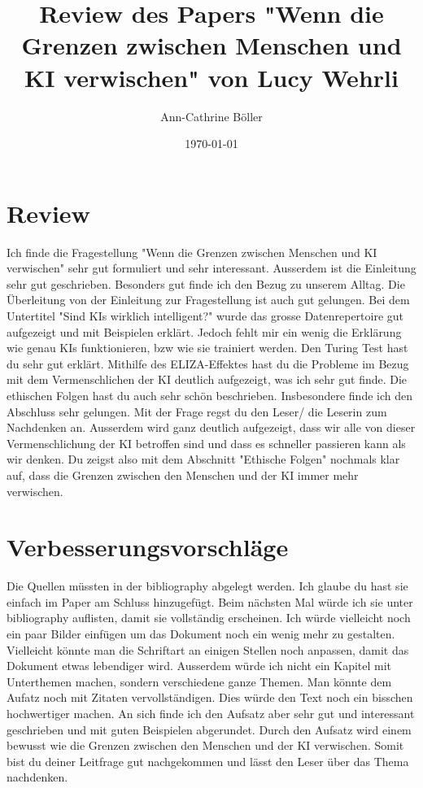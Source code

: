 \documentclass{article}
\title{Review des Papers "Wenn die Grenzen zwischen Menschen und KI verwischen" von Lucy Wehrli}
\author{Ann-Cathrine Böller}
\date{\today}
\begin{document}
\maketitle


\section{Review}
Ich finde die Fragestellung "Wenn die Grenzen zwischen Menschen und KI verwischen" sehr gut formuliert und sehr interessant. Ausserdem ist die Einleitung sehr gut geschrieben. Besonders gut finde ich den Bezug zu unserem Alltag. Die Überleitung von der Einleitung zur Fragestellung ist auch gut gelungen. 
Bei dem Untertitel "Sind KIs wirklich intelligent?" wurde das grosse Datenrepertoire gut aufgezeigt und mit Beispielen erklärt. Jedoch fehlt mir ein wenig die Erklärung wie genau KIs funktionieren, bzw wie sie trainiert werden. Den Turing Test hast du sehr gut erklärt. Mithilfe des ELIZA-Effektes hast du die Probleme im Bezug mit dem Vermenschlichen der KI deutlich aufgezeigt, was ich sehr gut finde. Die ethischen Folgen hast du auch sehr schön beschrieben. Insbesondere finde ich den Abschluss sehr gelungen. Mit der Frage regst du den Leser/ die Leserin zum Nachdenken an. Ausserdem wird ganz deutlich aufgezeigt, dass wir alle von dieser Vermenschlichung der KI betroffen sind und dass es schneller passieren kann als wir denken. Du zeigst also mit dem Abschnitt "Ethische Folgen" nochmals klar auf, dass die Grenzen zwischen den Menschen und der KI immer mehr verwischen. 


\section{Verbesserungsvorschläge}
Die Quellen müssten in der bibliography abgelegt werden. Ich glaube du hast sie einfach im Paper am Schluss hinzugefügt. Beim nächsten Mal würde ich sie unter bibliography auflisten, damit sie vollständig erscheinen. Ich würde vielleicht noch ein paar Bilder einfügen um das Dokument noch ein wenig mehr zu gestalten. Vielleicht könnte man die Schriftart an einigen Stellen noch anpassen, damit das Dokument etwas lebendiger wird. Ausserdem würde ich nicht ein Kapitel mit Unterthemen machen, sondern verschiedene ganze Themen. Man könnte dem Aufatz noch mit Zitaten vervollständigen. Dies würde den Text noch ein bisschen hochwertiger machen. An sich finde ich den Aufsatz aber sehr gut und interessant geschrieben und mit guten Beispielen abgerundet. Durch den Aufsatz wird einem bewusst wie die Grenzen zwischen den Menschen und der KI verwischen. Somit bist du deiner Leitfrage gut nachgekommen und lässt den Leser über das Thema nachdenken. 
\end{document}
